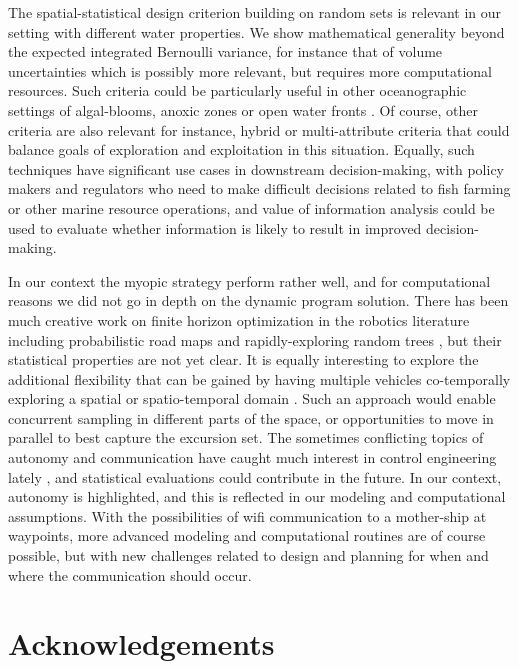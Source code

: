 \documentclass[aoas]{imsart}
\begin{document}
The spatial-statistical design criterion building on random sets is
relevant in our setting with different water properties. 
We show
mathematical generality beyond the expected integrated Bernoulli variance, for instance that of volume uncertainties which is possibly more relevant, but requires more computational resources.
Such criteria could be particularly useful in other oceanographic settings of algal-blooms, anoxic
zones or open water fronts \cite{costa19}.
Of course, other criteria
are also relevant for instance, hybrid or multi-attribute criteria
that could balance goals of exploration and exploitation in this
situation. Equally, such techniques have significant use cases in
downstream decision-making, with policy makers and regulators who need
to make difficult decisions related to fish farming or other marine
resource operations, and value of information analysis
\citep{Eidsvik:15} could be used to evaluate whether
information is likely to result in improved decision-making.


In our context the myopic strategy perform rather well, and for computational reasons we did not go in depth on the dynamic program solution. There has been much creative work on finite horizon optimization in the robotics literature including probabilistic road maps and rapidly-exploring random trees \citep{karaman2011sampling}, but their statistical properties are not yet clear.
It is equally interesting to
explore the additional flexibility that can be gained by having
multiple vehicles co-temporally exploring a spatial or spatio-temporal
domain \citep{ferreira2019advancing}. Such an approach would enable
concurrent sampling in different parts of the space, or opportunities
to move in parallel to best capture the excursion set.
The sometimes conflicting topics of autonomy and communication have caught much interest in control engineering lately \citep{zolich2019survey}, and statistical evaluations could contribute in the future. In our context, autonomy is highlighted, and this is reflected in our modeling and computational assumptions. With the possibilities of wifi communication to a mother-ship at waypoints, more advanced modeling and computational routines are of course possible, but with new challenges related to design and planning for when and where the communication should occur. 


\section*{Acknowledgements}
\end{document}
